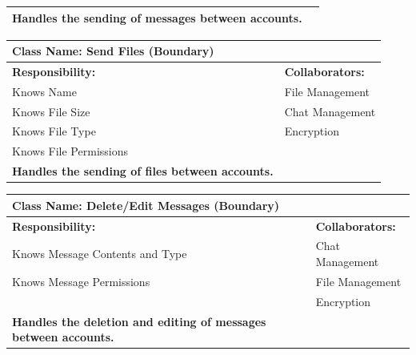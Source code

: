 \documentclass[]{article}
\begin{document}
\begin{itemize}
\begin{table}[ht]
\begin{tabular}{|p{7cm}|p{7cm}|}
            \vspace{0.1in}
            \textbf{Handles the sending of messages between accounts.}

		\vspace{1in} & \\
		\hline
  
		\end{tabular}
	\end{table}

 
	\begin{table}[ht]
		\centering
		\begin{tabular}{|p{7cm}|p{7cm}|}
		\hline 
		 \multicolumn{2}{|l|}{\textbf{Class Name:} Send Files (Boundary)} \\
		\hline
		\textbf{Responsibility:} & \textbf{Collaborators:} \\
		\hline
            Knows Name & File Management\\
            Knows File Size & Chat Management\\
            Knows File Type & Encryption\\
            Knows File Permissions\\
            
            \vspace{0.1in}
            \textbf{Handles the sending of files between accounts.}

		\vspace{1in} & \\
		\hline
  
		\end{tabular}
	\end{table}

	\begin{table}[ht]
		\centering
		\begin{tabular}{|p{7cm}|p{7cm}|}
		\hline 
		 \multicolumn{2}{|l|}{\textbf{Class Name:} Delete/Edit Messages (Boundary)} \\
		\hline
		\textbf{Responsibility:} & \textbf{Collaborators:} \\
		\hline
            Knows Message Contents and Type & Chat Management\\
            Knows Message Permissions & File Management\\
            & Encryption\\
            
            \vspace{0.1in}
            \textbf{Handles the deletion and editing of messages between accounts.}


\end{tabular}
\end{table}
\end{itemize}
\end{document}
